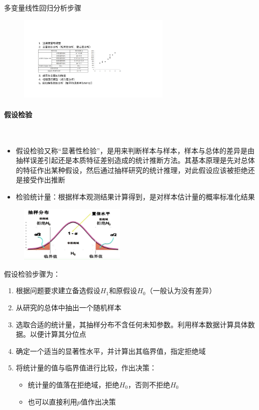 多变量线性回归分析步骤
\begin{figure}[H]
    \vspace{-0.5em}
	\centering
	\includegraphics[width=0.65\textwidth]{images/多变量线性回归分析步骤.pdf}
    \vspace{-1em}
\end{figure}

\paragraph{假设检验}~{} \par
\begin{itemize}
    \item 假设检验又称“显著性检验”，是用来判断样本与样本，样本与总体的差异是由抽样误差引起还是本质特征差别造成的统计推断方法。其基本原理是先对总体的特征作出某种假设，然后通过抽样研究的统计推理，对此假设应该被拒绝还是接受作出推断
    \item 检验统计量：根据样本观测结果计算得到，是对样本估计量的概率标准化结果
\end{itemize}

\begin{figure}[H]
    \vspace{-0.5em}
	\centering
	\includegraphics[width=0.45\textwidth]{images/假设检验.png}
    \vspace{-1em}
\end{figure}

假设检验步骤为：
\begin{enumerate}[label=\arabic*.]
    \item 根据问题要求建立备选假设$H_1$和原假设$H_0$（一般认为没有差异）
    \item 从研究的总体中抽出一个随机样本
    \item 选取合适的统计量，其抽样分布不含任何未知参数。利用样本数据计算具体数据。以便计算其分位点
    \item 确定一个适当的显著性水平，并计算出其临界值，指定拒绝域
    \item 将统计量的值与临界值进行比较，作出决策：
    \begin{itemize}
        \item 统计量的值落在拒绝域，拒绝$H_0$，否则不拒绝$H_0$
        \item 也可以直接利用$p$值作出决策
    \end{itemize}
\end{enumerate}

